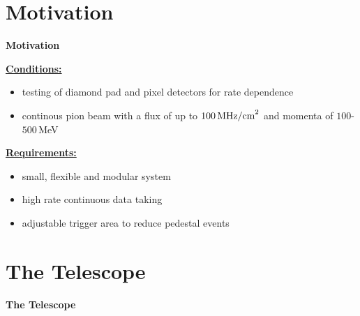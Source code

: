 \documentclass[9pt]{beamer}
\begin{document}
\section{Motivation}
\begin{frame}
	\begin{alertblock}{
		\begin{center}
			\Large{\textbf{Motivation}}
		\end{center}}
	\end{alertblock}
\end{frame}
\begin{frame}
	\underline{\textbf{Conditions:}}
	\begin{itemize}
		\item testing of diamond pad and pixel detectors for rate dependence
		\item continous pion beam with a flux of up to $100\,\text{MHz/cm}^{2}$ and momenta of $100$-$500$\,MeV
	\end{itemize}
	\underline{\textbf{Requirements:}}
	\begin{itemize}
		\item small, flexible and modular system
		\item high rate continuous data taking
		\item adjustable trigger area to reduce pedestal events
	\end{itemize}
\end{frame}
\section{The Telescope}
\begin{frame}
	\begin{alertblock}{
		\begin{center}
			\Large{\textbf{The Telescope}}
		\end{center}}
	\end{alertblock}
\end{frame}
\end{document}
